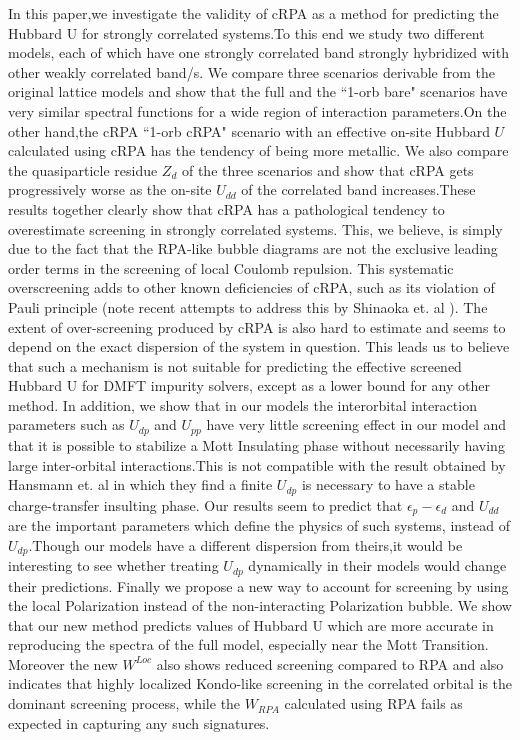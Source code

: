\documentclass[10pt]{ruthesis}
\begin{document}
{In this paper,we investigate the validity of cRPA as a method for predicting the Hubbard U for strongly correlated systems.To this end we study two different models, each of which have one strongly correlated band strongly hybridized with other weakly correlated band/s.  We compare three scenarios derivable from the original lattice models and show that the full  and the ``1-orb bare" scenarios have very similar spectral functions for a wide region of interaction parameters.On the other hand,the cRPA ``1-orb cRPA" scenario with an effective on-site Hubbard $U$ calculated using cRPA has the tendency of being more metallic. We also compare the quasiparticle residue $Z_d$ of the three scenarios and show that cRPA gets progressively worse as the on-site $U_{dd}$ of the correlated band increases.These results together clearly show that cRPA has a pathological tendency  to overestimate screening in strongly correlated systems. This, we believe, is simply due to the fact that the RPA-like bubble diagrams are not the exclusive leading order terms in the screening of local Coulomb repulsion.  This systematic overscreening adds to other known deficiencies of cRPA, such as its violation of Pauli principle (note recent attempts to address this by Shinaoka et. al \cite{PRB_AccurayofcRPA_2014_P.Werner}). The extent of over-screening produced by cRPA is also hard to estimate and seems to depend on the exact dispersion of the system in question. This leads us to believe that such a mechanism is not suitable for predicting the effective screened Hubbard U for DMFT impurity solvers, except as a lower bound for any other method.  In addition, we show that in our models the interorbital interaction parameters such as $U_{dp}$ and $U_{pp}$ have very little screening effect in our model and that it is possible to stabilize a Mott Insulating phase without necessarily having large inter-orbital interactions.This is not compatible with the result obtained by Hansmann et. al \cite{NJOP_Udp_in_cuprates_2014_K.Held} in which they find a finite $U_{dp}$ is necessary to have a stable charge-transfer insulting phase. Our results seem to predict that $\epsilon_p-\epsilon_d$ and $U_{dd}$ are the important parameters which define the physics of such systems, instead of $U_{dp}$.Though our models have a different dispersion from theirs,it would be interesting to see whether treating $U_{dp}$ dynamically in their models would change their predictions. Finally we propose a new way to account for screening by using the local Polarization instead of the non-interacting Polarization bubble. We show that our new method predicts values of Hubbard U which are more accurate in reproducing the spectra of the full model, especially near the Mott Transition. Moreover the new $W^{Loc}$ also shows reduced screening compared to RPA and also indicates that highly localized Kondo-like screening in the correlated orbital is the dominant screening process, while the $W_{RPA}$ calculated using RPA fails as expected in capturing any such signatures.

}
\end{document}
